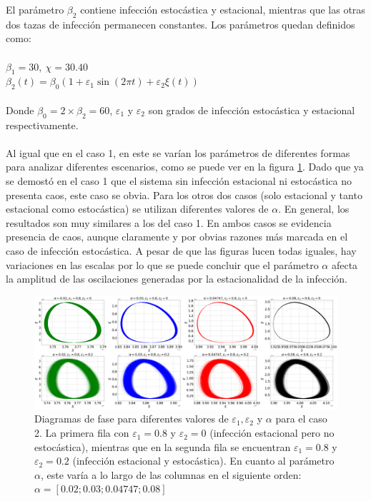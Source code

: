 \documentclass[conference]{IEEEtran}
\begin{document}
El parámetro $\beta_2$ contiene infección estocástica y estacional, mientras que las otras dos tazas de infección permanecen constantes. Los parámetros quedan definidos como:
\\\\
$\beta_1 = 30, \ \chi = 30.40$
\\
$\beta_2(t) = \beta_0(1+\varepsilon_1 \sin(2 \pi t) + \varepsilon_2 \xi(t))$
\\\\
Donde $\beta_0 = 2 \times \beta_2 = 60$, $\varepsilon_1$ y $\varepsilon_2$ son grados de infección estocástica y estacional respectivamente.
\\\\
Al igual que en el caso 1, en este se varían los parámetros de diferentes formas para analizar diferentes
escenarios, como se puede ver en la figura \ref{case_2}. Dado que ya se demostó en el caso 1 que el sistema sin infección estacional ni estocástica no 
presenta caos, este caso se obvia. Para los otros dos casos (solo estacional y tanto estacional como estocástica)
se utilizan diferentes valores de $\alpha$. En general, los resultados son muy similares a los del caso 1. 
En ambos casos se evidencia presencia de caos, aunque claramente y por obvias razones más marcada en el
caso de infección estocástica. A pesar de que las figuras lucen todas iguales, hay variaciones en las escalas
por lo que se puede concluir que el parámetro $\alpha$ afecta la amplitud de las oscilaciones generadas por 
la estacionalidad de la infección.

\begin{figure}[h]
    \centering
    \includegraphics[width=18cm]{../Figures/case_2.png}
    \caption{Diagramas de fase para diferentes valores de $\varepsilon_1, \varepsilon_2$ y $\alpha$ para el caso 2. 
    La primera fila con $\varepsilon_1 = 0.8$ y $\varepsilon_2 = 0$ (infección estacional
    pero no estocástica), mientras que en la segunda fila se encuentran $\varepsilon_1 = 0.8$ y $\varepsilon_2 = 0.2$
    (infección estacional y estocástica). En cuanto al parámetro $\alpha$, este varía a lo largo de las
    columnas en el siguiente orden: $\alpha = [0.02 ; 0.03 ; 0.04747 ; 0.08]$}
    \label{case_2}
\end{figure}
\end{document}
